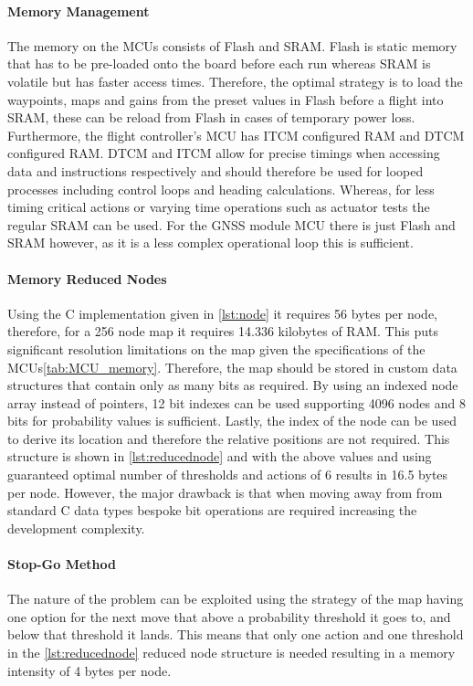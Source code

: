 \paragraph{Memory Management}
The memory on the \gls{MCU}s consists of Flash and \gls{SRAM}. Flash is static memory that has to be pre-loaded onto the board before each run whereas \gls{SRAM} is volatile but has faster access times. Therefore, the optimal strategy is to load the waypoints, maps and gains from the preset values in Flash before a flight into \gls{SRAM}, these can be reload from Flash in cases of temporary power loss. Furthermore, the flight controller's \gls{MCU} has \gls{ITCM} configured \gls{RAM} and \gls{DTCM} configured \gls{RAM}. \gls{DTCM} and \gls{ITCM} allow for precise timings when accessing data and instructions respectively and should therefore be used for looped processes including control loops and heading calculations. Whereas, for less timing critical actions or varying time operations such as actuator tests the regular \gls{SRAM} can be used. For the \gls{GNSS} module \gls{MCU} there is just Flash and \gls{SRAM} however, as it is a less complex operational loop this is sufficient. 

\paragraph{Memory Reduced Nodes}
Using the C implementation given in \ref{lst:node} it requires 56 bytes per node, therefore, for a 256 node map it requires 14.336 kilobytes of \gls{RAM}. This puts significant resolution limitations on the map given the specifications of the \gls{MCU}s\ref{tab:MCU_memory}. Therefore, the map should be stored in custom data structures that contain only as many bits as required. By using an indexed node array instead of pointers, 12 bit indexes can be used supporting 4096 nodes and 8 bits for probability values is sufficient. Lastly, the index of the node can be used to derive its location and therefore the relative positions are not required. This structure is shown in \ref{lst:reducednode} and with the above values and using guaranteed optimal number of thresholds and actions of 6 results in 16.5 bytes per node. However, the major drawback is that when moving away from from standard C data types bespoke bit operations are required increasing the development complexity. 
\paragraph{Stop-Go Method}
The nature of the problem can be exploited using the strategy of the map having one option for the next move that above a probability threshold it goes to, and below that threshold it lands. This means that only one action and one threshold in the \ref{lst:reducednode} reduced node structure is needed resulting in a memory intensity of 4 bytes per node. 
